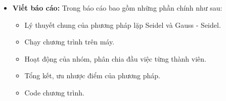 \documentclass[12pt,a4paper]{article}
\begin{document}
{\begin{itemize}
\begin{itemize}
\item Nhóm cũng đã chuẩn bị phần slide và code để trình chiếu, tuy còn chưa được hoàn chỉnh. Dưới sự góp ý của giáo viên bộ môn, nhóm cũng đã rút kinh nghiệm và chỉnh sửa lại trong phần báo cáo lần này.\\
\end{itemize}
\item{\textbf{Viết báo cáo:}} Trong báo cáo bao gồm những phần chính như sau: 
\begin{itemize}

\item Lý thuyết chung của phương pháp lặp Seidel và Gauss - Seidel.\\

\item Chạy chương trình trên máy.\\

\item Hoạt động của nhóm, phân chia đầu việc từng thành viên.\\

\item Tổng kết, ưu nhược điểm của phương pháp.\\

\item Code chương trình.\\

\end{itemize}
 

\end{itemize}
}
\newpage
\end{document}
